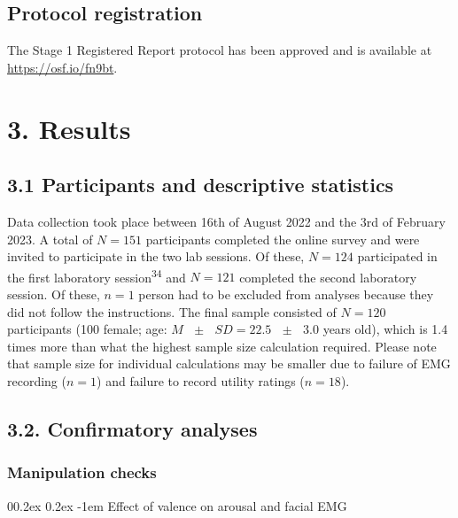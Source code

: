 \documentclass[
  man,floatsintext]{apa6}
\makeatletter
\let\oldparagraph\paragraph
\renewcommand{\paragraph}[1]{\oldparagraph{#1}\mbox{}}
\renewcommand{\paragraph}{\@startsection{paragraph}{4}{\parindent}%
  {0\baselineskip \@plus 0.2ex \@minus 0.2ex}%
  {-1em}%
  {\normalfont\normalsize\bfseries\itshape\typesectitle}}
\makeatother
\begin{document}
\hypertarget{protocol-registration}{%
\subsection{Protocol registration}\label{protocol-registration}}

The Stage 1 Registered Report protocol has been approved and is available at \url{https://osf.io/fn9bt}.

\hypertarget{results}{%
\section{3. Results}\label{results}}

\hypertarget{participants-and-descriptive-statistics}{%
\subsection{3.1 Participants and descriptive statistics}\label{participants-and-descriptive-statistics}}

Data collection took place between 16th of August 2022 and the 3rd of February 2023.
A total of \(N=151\) participants completed the online survey and were invited to participate in the two lab sessions.
Of these, \(N=124\) participated in the first laboratory session\textsuperscript{34} and \(N=121\) completed the second laboratory session.
Of these, \(n=1\) person had to be excluded from analyses because they did not follow the instructions.
The final sample consisted of \(N=120\) participants (100 female; age: \(M\text{ }\pm\text{ }SD =22.5\text{ }\pm\text{ }3.0\) years old), which is 1.4 times more than what the highest sample size calculation required.
Please note that sample size for individual calculations may be smaller due to failure of EMG recording (\(n=1\)) and failure to record utility ratings (\(n=18\)).

\hypertarget{confirmatory-analyses}{%
\subsection{3.2. Confirmatory analyses}\label{confirmatory-analyses}}

\hypertarget{manipulation-checks}{%
\subsubsection{Manipulation checks}\label{manipulation-checks}}

\hypertarget{effect-of-valence-on-arousal-and-facial-emg}{%
\paragraph{Effect of valence on arousal and facial EMG}\label{effect-of-valence-on-arousal-and-facial-emg}}
\end{document}
